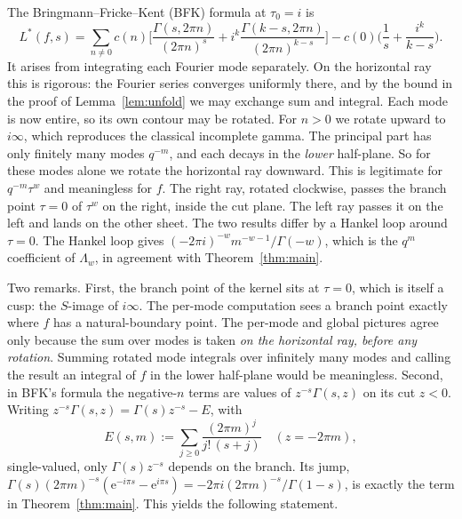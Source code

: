 \documentclass[11pt]{article}
\theoremstyle{definition}
\theoremstyle{remark}
\newcommand{\e}{\mathrm{e}}
\begin{document}
The Bringmann--Fricke--Kent (BFK) formula at $\tau_0=i$ is
\[
L^*(f,s)=\sum_{n\ne0}c(n)\Big[\frac{\Gamma(s,2\pi n)}{(2\pi n)^s}+i^k\frac{\Gamma(k-s,2\pi n)}{(2\pi n)^{k-s}}\Big]-c(0)\Big(\frac1s+\frac{i^k}{k-s}\Big).
\]
It arises from integrating each Fourier mode separately. On the horizontal ray this is
rigorous: the Fourier series converges uniformly there, and by the bound in the proof of
Lemma~\ref{lem:unfold} we may exchange sum and integral. Each mode is now entire, so its own contour may
be rotated. For $n>0$ we rotate upward to $i\infty$, which reproduces the classical
incomplete gamma. The principal part has only finitely many modes $q^{-m}$, and each
decays in the \emph{lower} half-plane. So for these modes alone we rotate the horizontal
ray downward. This is legitimate for $q^{-m}\tau^w$ and meaningless for $f$. The right
ray, rotated clockwise, passes the branch point $\tau=0$ of $\tau^w$ on the right,
inside the cut plane. The left ray passes it on the left and lands on the other sheet.
The two results differ by a Hankel loop around $\tau=0$. The Hankel loop gives
$(-2\pi i)^{-w}m^{-w-1}/\Gamma(-w)$, which is the $q^m$ coefficient of $\Lambda_w$, in agreement
with Theorem~\ref{thm:main}.

Two remarks. First, the branch point of the kernel sits at $\tau=0$, which is itself a
cusp: the $S$-image of $i\infty$. The per-mode computation sees a branch point exactly
where $f$ has a natural-boundary point. The per-mode and global pictures agree only
because the sum over modes is taken \emph{on the horizontal ray, before any rotation}.
Summing rotated mode integrals over infinitely many modes and calling the result an
integral of $f$ in the lower half-plane would be meaningless. Second, in BFK's formula
the negative-$n$ terms are values of $z^{-s}\Gamma(s,z)$ on its cut $z<0$. Writing
$z^{-s}\Gamma(s,z)=\Gamma(s)z^{-s}-E$, with
\[
E(s,m):=\sum_{j\ge0}\frac{(2\pi m)^j}{j!\,(s+j)}\quad(z=-2\pi m),
\]
single-valued, only $\Gamma(s)z^{-s}$ depends on the branch. Its jump,
$\Gamma(s)(2\pi m)^{-s}(\e^{-i\pi s}-\e^{i\pi s})=-2\pi i(2\pi m)^{-s}/\Gamma(1-s)$, is exactly the term in
Theorem~\ref{thm:main}. This yields the following statement.
\end{document}
